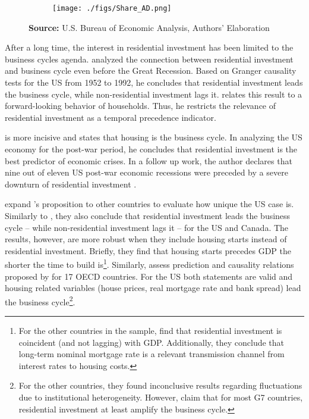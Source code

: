 \documentclass[12pt, a4paper]{article}
\begin{document}
\begin{figure}[H]
    \centering
	\caption{Expenditures share on aggregate demand}
	\label{fig:share}
\begin{figure}[htb]
    \texttt{[image: ./figs/Share\_AD.png]}
    \end{figure}
	\caption*{\textbf{Source:} U.S. Bureau of Economic Analysis, Authors' Elaboration}
\end{figure}

After a long time, the interest in residential investment has been limited to the business cycles agenda.
\textcite{green_follow_1997} analyzed the connection between residential investment and business cycle even before the Great Recession.
Based on Granger causality tests for the US from 1952 to 1992, he concludes that residential investment leads the business cycle, while non-residential investment lags it.
\textcite{green_follow_1997} relates this result to a forward-looking behavior of households.
Thus, he restricts the relevance of residential investment as a temporal precedence indicator.

\textcite{leamer_housing_2007} is more incisive and states that housing is the business cycle.
In analyzing the US economy for the post-war period, he concludes that residential investment is the best predictor of economic crises.
In a follow up work, the author declares that nine out of eleven US post-war economic recessions were preceded by a severe downturn of residential investment \cite{leamer_housing_2015}.

\textcite{kydland_2016_housing} expand \citeauthor*{leamer_housing_2007}'s \citeyear{leamer_housing_2007} proposition to other countries to evaluate how unique the US case is.
Similarly to \textcite{green_follow_1997}, they also conclude that residential investment leads the business cycle -- while non-residential investment lags it -- for the US and Canada.
The results, however, are more robust when they include housing starts instead of residential investment.
Briefly, they find that housing starts precedes GDP the shorter the time to build is\footnote{For the other countries in the sample, \textcite{kydland_2016_housing} find that residential investment is coincident (and not lagging) with GDP. Additionally, they conclude that long-term nominal mortgage rate is a relevant transmission channel from interest rates to housing costs.}.
Similarly, \textcite{huang_is_2018} assess  prediction and causality relations proposed by \textcite{leamer_housing_2007} for 17 OECD countries.
For the US both statements are valid and housing related variables (house prices, real mortgage rate and bank spread) lead the business cycle\footnote{For the other countries, they found inconclusive results regarding fluctuations due to institutional heterogeneity. However, \textcite{huang_is_2018} claim that for most G7 countries, residential investment at least amplify the business cycle.}.
\end{document}
